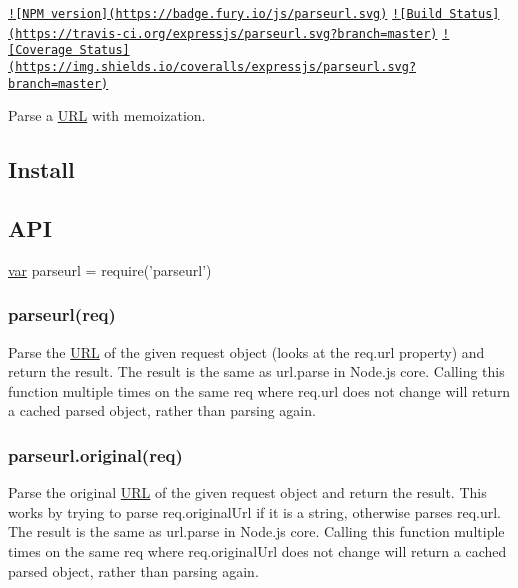 \href{http://badge.fury.io/js/parseurl}{\tt !\mbox{[}N\+P\+M version\mbox{]}(https\+://badge.\+fury.\+io/js/parseurl.\+svg)} \href{https://travis-ci.org/expressjs/parseurl}{\tt !\mbox{[}Build Status\mbox{]}(https\+://travis-\/ci.\+org/expressjs/parseurl.\+svg?branch=master)} \href{https://coveralls.io/r/expressjs/parseurl}{\tt !\mbox{[}Coverage Status\mbox{]}(https\+://img.\+shields.\+io/coveralls/expressjs/parseurl.\+svg?branch=master)}

Parse a \hyperlink{struct_u_r_l}{U\+R\+L} with memoization.

\subsection*{Install}




\subsection*{A\+P\+I}


\begin{DoxyCode}
\hyperlink{018__def_8c_a335628f2e9085305224b4f9cc6e95ed5}{var} parseurl = require(\textcolor{stringliteral}{'parseurl'})
\end{DoxyCode}


\subsubsection*{parseurl(req)}

Parse the \hyperlink{struct_u_r_l}{U\+R\+L} of the given request object (looks at the {\ttfamily req.\+url} property) and return the result. The result is the same as {\ttfamily url.\+parse} in Node.\+js core. Calling this function multiple times on the same {\ttfamily req} where {\ttfamily req.\+url} does not change will return a cached parsed object, rather than parsing again.

\subsubsection*{parseurl.\+original(req)}

Parse the original \hyperlink{struct_u_r_l}{U\+R\+L} of the given request object and return the result. This works by trying to parse {\ttfamily req.\+original\+Url} if it is a string, otherwise parses {\ttfamily req.\+url}. The result is the same as {\ttfamily url.\+parse} in Node.\+js core. Calling this function multiple times on the same {\ttfamily req} where {\ttfamily req.\+original\+Url} does not change will return a cached parsed object, rather than parsing again.


